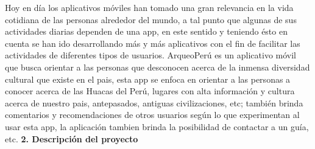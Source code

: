 \documentclass[12pt,a4paper]{report}
\begin{document}
\newpage
{}
\hfill \break
Hoy en d\'ia los aplicativos m\'oviles han tomado una gran relevancia en la vida cotidiana de las personas alrededor del mundo, a tal punto que algunas de sus actividades diarias dependen de una app, en este sentido y teniendo \'esto en cuenta se han ido desarrollando m\'as y m\'as aplicativos con el fin de facilitar las actividades de diferentes tipos de usuarios.\newline
\hfill \break
ArqueoPer\'u es un aplicativo m\'ovil que busca orientar a las personas que desconocen acerca de la inmensa diversidad cultural que existe en el pais, esta app se enfoca en orientar a las personas a conocer acerca de las Huacas del Per\'u, lugares con alta informaci\'on y cultura acerca de nuestro pais, antepasados, antiguas civilizaciones, etc; tambi\'en brinda comentarios y recomendaciones de otros usuarios seg\'un lo que experimentan al usar esta app, la aplicaci\'on tambien brinda la posibilidad de contactar a un gu\'ia, etc.
\hfill \break
\hfill \break
\hfill \break
\textbf{\Large 2. \hspace{0.3cm} Descripci\'on del proyecto}
\hfill \break
\end{document}
